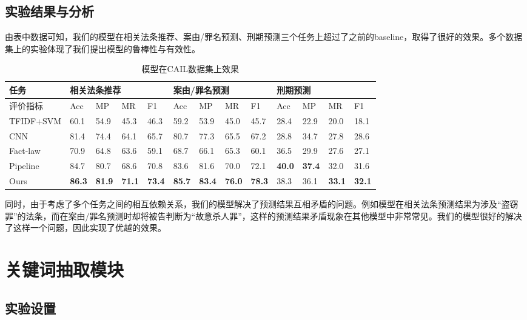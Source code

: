 \subsection{实验结果与分析}
由表中数据可知，我们的模型在相关法条推荐、案由/罪名预测、刑期预测三个任务上超过了之前的baseline，取得了很好的效果。多个数据集上的实验体现了我们提出模型的鲁棒性与有效性。

\begin{table}[]
\begin{tabular}{l|llll|llll|llll}
\hline
任务        & \multicolumn{4}{l}{相关法条推荐} & \multicolumn{4}{l|}{案由/罪名预测} & \multicolumn{4}{l}{刑期预测}  \\
\hline
评价指标      & Acc   & MP   & MR   & F1   & Acc   & MP    & MR   & F1   & Acc  & MP   & MR   & F1   \\ \hline
TFIDF+SVM & 60.1  & 54.9 & 45.3 & 46.3 & 59.2  & 53.9  & 45.0 & 45.7 & 28.4 & 22.9 & 20.0 & 18.1 \\
CNN       & 81.4  & 74.4 & 64.1 & 65.7 & 80.7  & 77.3  & 65.5 & 67.2 & 28.8 & 34.7 & 27.8 & 28.6 \\
Fact-law  & 70.9  & 64.8 & 63.6 & 59.1 & 68.7  & 66.1  & 65.3 & 60.1 & 36.5 & 29.9 & 27.6 & 27.1 \\
Pipeline  & 84.7  & 80.7 & 68.6 & 70.8 & 83.6  & 81.6  & 70.0 & 72.1 & \textbf{40.0}   & \textbf{37.4} & 32.0 & 31.6 \\ \hline
Ours      & \textbf{86.3}  & \textbf{81.9} & \textbf{71.1} & \textbf{73.4} & \textbf{85.7}  & \textbf{83.4}  & \textbf{76.0}   & \textbf{78.3} & 38.3 & 36.1 & \textbf{33.1} & \textbf{32.1} \\ \hline
\end{tabular}
\caption{模型在CAIL数据集上效果}
\label{table: result_judge_cail}
\end{table}

同时，由于考虑了多个任务之间的相互依赖关系，我们的模型解决了预测结果互相矛盾的问题。例如模型在相关法条预测结果为涉及“盗窃罪”的法条，而在案由/罪名预测时却将被告判断为“故意杀人罪”，这样的预测结果矛盾现象在其他模型中非常常见。我们的模型很好的解决了这样一个问题，因此实现了优越的效果。


\section{关键词抽取模块}
\subsection{实验设置}

